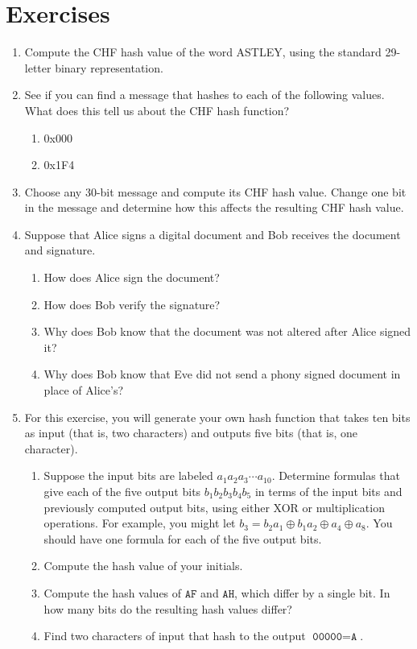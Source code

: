 \documentclass{book}
\theoremstyle{plain}
\theoremstyle{definition}
\newif\ifprintsolutions
\newcommand{\solution}[1]{\ifprintsolutions \begin{sloppypar}{\it #1}\end{sloppypar} \fi} %
\newcommand{\ciphertext}[1]{\texttt{#1}} %
\begin{document}
\section{Exercises}
\begin{enumerate}
\item Compute the CHF hash value of the word ASTLEY, using the standard 29-letter binary representation. \solution{CHF(\ciphertext{00000 10010 10011 01011 00100 11000}) = \ciphertext{1011110110}}
\item See if you can find a message that hashes to each of the following values. What does this tell us about the CHF hash function?
\begin{enumerate}
\item 0x000 \solution{Choose a message of all zero bits.}
\item 0x1F4 \solution{Choose a message of all one bits.}
\end{enumerate}
\item Choose any 30-bit message and compute its CHF hash value. Change one bit in the message and determine how this affects the resulting CHF hash value.
\item Suppose that Alice signs a digital document and Bob receives the document and signature.
\begin{enumerate}
\item How does Alice sign the document?
\item How does Bob verify the signature?
\item Why does Bob know that the document was not altered after Alice signed it?
\item Why does Bob know that Eve did not send a phony signed document in place of Alice's?
\end{enumerate}
\item For this exercise, you will generate your own hash function that takes ten bits as input (that is, two characters) and outputs five bits (that is, one character).
\begin{enumerate}
\item Suppose the input bits are labeled $a_1a_2a_3 \cdots a_{10}$. Determine formulas that give each of the five output bits $b_1b_2b_3b_4b_5$ in terms of the input bits and previously computed output bits, using either XOR or multiplication operations. For example, you might let $b_3 = b_2a_1 \oplus b_1a_2 \oplus a_4 \oplus a_8$. You should have one formula for each of the five output bits.
\item Compute the hash value of your initials.
\item Compute the hash values of $\texttt{AF}$ and $\texttt{AH}$, which differ by a single bit. In how many bits do the resulting hash values differ?
\item Find two characters of input that hash to the output $\texttt{00000} = \texttt{A}$.
\end{enumerate}
\end{enumerate}
\end{document}
